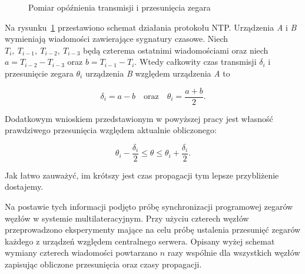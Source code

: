 \begin{figure}[H]
    \centering
    \begin{subfigure}[b]{0.65\textwidth}
    \centering
    \end{subfigure}
    \caption{Pomiar opóźnienia transmisji i przesunięcia zegara}
    \label{fig:ntp}
\end{figure}

Na rysunku~\ref{fig:ntp} przestawiono schemat działania protokołu NTP. Urządzenia \textit{A} i \textit{B} wymieniają wiadomości zawierające sygnatury czasowe. Niech $T_{i},\ T_{i-1},\ T_{i-2},\ T_{i-3}$ będą czterema ostatnimi wiadomościami oraz niech $a = T_{i-2} - T_{i-3}$ oraz $b = T_{i-1} - T_i$. Wtedy całkowity czas transmisji $\delta_i$ i przesunięcie zegara $\theta_i$ urządzenia \textit{B} względem urządzenia \textit{A} to

\[\delta_i = a - b\quad \text{oraz}\quad \theta_i = \frac{a+b}{2}.\]

Dodatkowym wnioskiem przedstawionym w powyższej pracy jest własność prawdziwego przesunięcia względem aktualnie obliczonego:

\[\theta_i - \frac{\delta_i}{2} \leqslant \theta \leqslant \theta_i + \frac{\delta_i}{2}.\]

Jak łatwo zauważyć, im krótszy jest czas propagacji tym lepsze przybliżenie dostajemy.

Na postawie tych informacji podjęto próbę synchronizacji programowej zegarów węzłów w systemie multilateracyjnym. Przy użyciu czterech węzłów przeprowadzono eksperymenty mające na celu próbę ustalenia przesunięć zegarów każdego z urządzeń względem centralnego serwera. Opisany wyżej schemat wymiany czterech wiadomości powtarzano $n$ razy wspólnie dla wszystkich węzłów zapisując obliczone przesunięcia oraz czasy propagacji.

